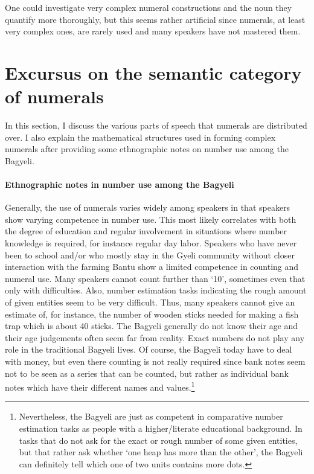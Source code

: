 \noindent One could investigate very complex numeral constructions and the noun they quantify more thoroughly, but this seems rather artificial since numerals, at least very complex ones, are rarely used and many speakers have not mastered them.


















\section{Excursus on the semantic category of numerals} 
\label{sec:Enum}

In this section, I discuss the various parts of speech that numerals are distributed over. I also explain the mathematical structures used in forming complex numerals after providing some ethnographic notes on number use among the Bagyeli.

\paragraph{Ethnographic notes in number use among the Bagyeli} Generally, the use of numerals varies widely among speakers in that speakers show varying competence in number use. This most likely correlates with both the degree of education and regular involvement in situations where number knowledge is required, for instance regular day labor. Speakers who have never been to school and/or who mostly stay in the Gyeli community without closer interaction with the farming Bantu show a limited competence in counting and numeral use. Many speakers cannot count further than `10', sometimes even that only with difficulties. Also, number estimation tasks indicating the rough amount of given entities seem to be very difficult. Thus, many speakers cannot give an estimate of, for instance, the number of wooden sticks needed for making a fish trap which is about 40 sticks. The Bagyeli generally do not know their age and their age judgements often seem far from reality. Exact numbers do not play any role in the traditional Bagyeli lives. Of course, the Bagyeli today have to deal with money, but even there counting is not really required since bank notes seem not to be seen as a series that can be counted, but rather as individual bank notes which have their different names and values.\footnote{Nevertheless, the Bagyeli are just as competent in comparative number estimation tasks as people with a higher/literate educational background. In tasks that do not ask for the exact or rough number of some given entities, but that rather ask whether `one heap has more than the other', %
the Bagyeli can definitely tell which one of two units contains more dots.} %

